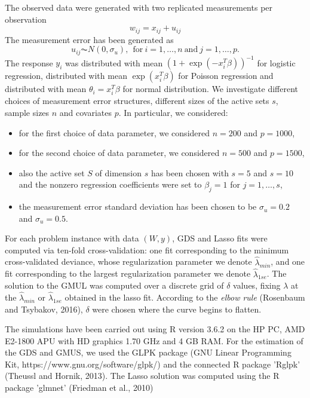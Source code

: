 \documentclass[a4paper,12pt,openany]{report}
\theoremstyle{plain}
\theoremstyle{plain}
\theoremstyle{plain}
\theoremstyle{plain}
\theoremstyle{plain}
\theoremstyle{plain}
\theoremstyle{plain}
\theoremstyle{plain}
\theoremstyle{plain}
\theoremstyle{plain}
\theoremstyle{plain}
\theoremstyle{plain}
\begin{document}
The observed data were generated with two replicated measurements per observation
\begin{equation}
w_{ij} = x_{ij}+u_{ij} 
\end{equation}
The measurement error has been generated as
\begin{equation}
u_{ij}\AC N(0,\sigma_{u}),  \ \ \text{for} \ i=1,\ldots,n \ \text{and} \ j=1,\ldots,p.
\end{equation}  
The response $y_i$ was distributed with mean $\left(1+\exp\left(-x_i^T\beta\right)\right)^{-1}$ for logistic regression, distributed with mean $\exp\left(x_i^T\beta\right)$ for Poisson regression and distributed with mean $\theta_i=x_i^T\beta$ for normal distribution.
We investigate different choices of measurement error structures, different sizes of the active sets $s$, sample sizes $n$ and covariates $p$. In particular, we considered:
\begin{itemize}
	\item for the first choice of data parameter, we considered $n=200$ and $p=1000$,
	\item for the second choice of data parameter, we considered $n=500$ and $p=1500$,
	\item also the active set $S$ of dimension $s$ has been chosen with $s=5$ and $s=10$ and the nonzero regression coefficients were set to $\beta_{j}=1$ for $j=1,\ldots, s$,
	\item the measurement error standard deviation has been chosen to be $\sigma_u=0.2$ and $\sigma_u=0.5$.
\end{itemize}
For each problem instance with data $(W,y)$, GDS and Lasso fits were computed via ten-fold cross-validation: one fit corresponding to the minimum cross-validated deviance, whose regularization parameter we denote $\hat{\lambda}_{min}$, and one fit corresponding to the largest regularization parameter we denote $\hat{\lambda}_{1se}$. The solution to the GMUL was computed over a discrete grid of $\delta$ values, fixing $\lambda$ at the $\hat{\lambda}_{min}$ or $\hat{\lambda}_{1se}$ obtained in the lasso fit. According to the \textit{elbow rule} (Rosenbaum and Tsybakov, 2016), $\delta$ were chosen where the curve begins to flatten.


The simulations have been carried out using R version 3.6.2 on the HP PC, AMD E2-1800 APU with HD graphics 1.70 GHz and 4 GB RAM. For the estimation of the GDS and GMUS, we used the GLPK package (GNU Linear Programming Kit, https://www.gnu.org/software/glpk/) and the connected R package 'Rglpk' (Theussl and Hornik, 2013). The Lasso solution was computed using the R package 'glmnet' (Friedman et al., 2010)
\end{document}
